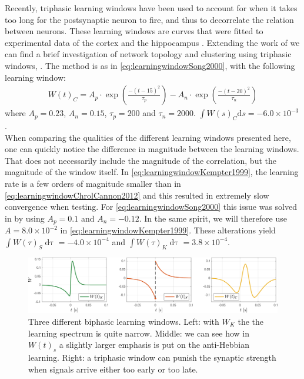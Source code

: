 Recently, triphasic learning windows have been used to account for when it takes too long for the postsynaptic neuron to fire, and thus to decorrelate the relation between neurons. These learning windows are curves that were fitted to experimental data of the cortex and the hippocampus \cite{ChrolCannon2014}. 
Extending the work of \cite{Song2000} we can find a brief investigation of network topology and clustering using triphasic windows, \cite{ChrolCannon2012}. The method is as in \eqref{eq:learningwindowSong2000}, with the following learning window:
\begin{align}
W(t)_C = A_{p} \cdot \exp \left(\frac{-\left(t - 15 \right)^{2}}{ \tau_{p}}\right) - A_{n} \cdot \exp \left(\frac{-\left(t - 20\right)^{2}}{ \tau_{n}}\right)  \label{eq:learningwindowChrolCannon2012}
\end{align}
where $A_{p}=0.23$, $A_{n}=0.15$, $\tau_{p}=200$ and $\tau_n = 2000$. $\int W(s)_C \mathrm{d}s = -6.0 \times 10^{-3}$. \\

When comparing the qualities of the different learning windows presented here, one can quickly notice the difference in magnitude between the learning windows. That does not necessarily include the magnitude of the correlation, but the magnitude of the window itself. In \eqref{eq:learningwindowKempter1999}, the learning rate is a few orders of magnitude smaller than in \eqref{eq:learningwindowChrolCannon2012} and this resulted in extremely slow convergence when testing. For \eqref{eq:learningwindowSong2000} this issue was solved in \cite{ChrolCannon2012} by using $A _p = 0.1$ and $A_n = -0.12$. In the same spirit, we will therefore use $A = 8.0 \times 10^{-2}$ in \eqref{eq:learningwindowKempter1999}. These alterations yield $\int W(\tau)_S \mathop{d \tau} = -4.0 \times 10^{-4}$ and $\int W(\tau)_K \mathop{d \tau} = 3.8 \times 10^{-4}$.

\begin{figure}[H]
\centering
\includegraphics[width = \textwidth]{../Figures/Learning/LearningWindows.pdf}
\caption{Three different biphasic learning windows. Left: with $W_K$ the the learning spectrum is quite narrow. Middle: we can see how in $W(t)_s$ a slightly larger emphasis is put on the anti-Hebbian learning. Right: a triphasic window can punish the synaptic strength when signals arrive either too early or too late.}
\label{fig:LearningWindows}
\end{figure}


